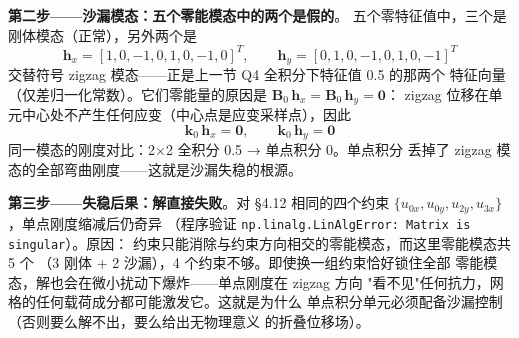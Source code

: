 \documentclass[12pt,a4paper]{ctexart}
\newcommand{\fem}{\Verb}
\begin{document}
\textbf{第二步——沙漏模态：五个零能模态中的两个是假的}。
五个零特征值中，三个是刚体模态（正常），另外两个是
\begin{equation}
\mathbf{h}_x = [1,0,-1,0,1,0,-1,0]^T,\qquad
\mathbf{h}_y = [0,1,0,-1,0,1,0,-1]^T
\end{equation}
交替符号 zigzag 模态——正是上一节 Q4 全积分下特征值 0.5 的那两个
特征向量（仅差归一化常数）。它们零能量的原因是
$\mathbf{B}_0\,\mathbf{h}_x = \mathbf{B}_0\,\mathbf{h}_y = \mathbf{0}$：
zigzag 位移在单元中心处不产生任何应变（中心点是应变采样点），因此
\begin{equation}
\mathbf{k}_0\,\mathbf{h}_x = \mathbf{0},\qquad
\mathbf{k}_0\,\mathbf{h}_y = \mathbf{0}
\end{equation}
同一模态的刚度对比：2$\times$2 全积分 0.5 → 单点积分 0。单点积分
丢掉了 zigzag 模态的全部弯曲刚度——这就是沙漏失稳的根源。

\textbf{第三步——失稳后果：解直接失败}。对 §4.12 相同的四个约束
$\{u_{0x}, u_{0y}, u_{2y}, u_{3x}\}$，单点刚度缩减后仍奇异
（程序验证 \fem|np.linalg.LinAlgError: Matrix is singular|）。原因：
约束只能消除与约束方向相交的零能模态，而这里零能模态共 5 个
（3 刚体 + 2 沙漏），4 个约束不够。即使换一组约束恰好锁住全部
零能模态，解也会在微小扰动下爆炸——单点刚度在 zigzag 方向
"看不见"任何抗力，网格的任何载荷成分都可能激发它。这就是为什么
单点积分单元必须配备沙漏控制（否则要么解不出，要么给出无物理意义
的折叠位移场）。
\end{document}
